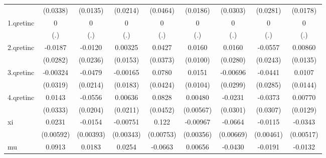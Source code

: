 {\begin{tabular}{l*{8}{c}}
            &    (0.0338)         &    (0.0135)         &    (0.0214)         &    (0.0464)         &    (0.0186)         &    (0.0303)         &    (0.0281)         &    (0.0178)         \\
[1em]
1.qretinc   &           0         &           0         &           0         &           0         &           0         &           0         &           0         &           0         \\
            &         (.)         &         (.)         &         (.)         &         (.)         &         (.)         &         (.)         &         (.)         &         (.)         \\
[1em]
2.qretinc   &     -0.0187         &     -0.0120         &     0.00325         &      0.0427         &      0.0160         &      0.0160         &     -0.0557\sym{*}  &     0.00860         \\
            &    (0.0282)         &    (0.0236)         &    (0.0153)         &    (0.0373)         &    (0.0100)         &    (0.0280)         &    (0.0243)         &    (0.0135)         \\
[1em]
3.qretinc   &    -0.00324         &     -0.0479\sym{*}  &    -0.00165         &      0.0780         &      0.0151         &    -0.00696         &     -0.0441         &      0.0107         \\
            &    (0.0319)         &    (0.0214)         &    (0.0183)         &    (0.0424)         &    (0.0104)         &    (0.0299)         &    (0.0285)         &    (0.0144)         \\
[1em]
4.qretinc   &      0.0143         &     -0.0556\sym{**} &     0.00636         &      0.0828         &     0.00480         &     -0.0231         &     -0.0373         &     0.00770         \\
            &    (0.0333)         &    (0.0204)         &    (0.0211)         &    (0.0452)         &   (0.00567)         &    (0.0301)         &    (0.0307)         &    (0.0129)         \\
[1em]
xi          &      0.0231\sym{***}&     -0.0154\sym{***}&    -0.00751\sym{*}  &       0.122\sym{***}&    -0.00967\sym{**} &     -0.0664\sym{***}&     -0.0115\sym{*}  &     -0.0343\sym{***}\\
            &   (0.00592)         &   (0.00393)         &   (0.00343)         &   (0.00753)         &   (0.00356)         &   (0.00669)         &   (0.00461)         &   (0.00517)         \\
[1em]
mu          &      0.0913\sym{***}&      0.0183\sym{***}&      0.0254\sym{***}&     -0.0663\sym{***}&     0.00656         &     -0.0430\sym{***}&     -0.0191         &     -0.0132\sym{*}  \\

\end{tabular}}
